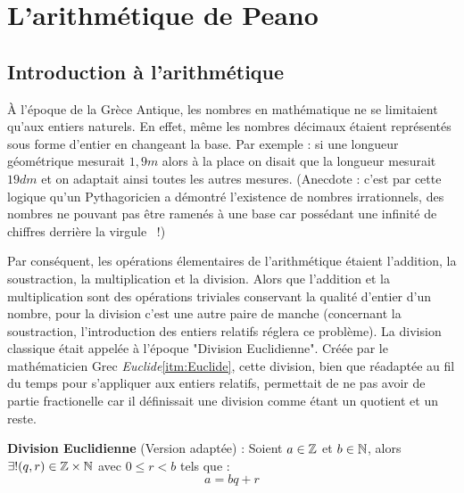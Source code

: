 \section{L'arithmétique de Peano}
\subsection{Introduction à l'arithmétique}

À l'époque de la Grèce Antique, les nombres en mathématique ne se limitaient qu'aux entiers naturels. \newline
En effet, même les nombres décimaux étaient représentés sous forme d'entier en changeant  la base. \newline
Par exemple : si une longueur géométrique mesurait $1,9 m$ alors à la place on disait que la longueur mesurait $19 dm$ et on adaptait ainsi toutes les autres mesures. \newline
\newline
(Anecdote : c'est par cette logique qu'un Pythagoricien a démontré l'existence de nombres irrationnels, des nombres ne pouvant pas être ramenés à une base car possédant une infinité de chiffres derrière la virgule \ !) \newline

Par conséquent, les opérations élementaires de l'arithmétique étaient l'addition, la soustraction, la multiplication et la division. \newline
Alors que l'addition et la multiplication sont des opérations triviales conservant la qualité d'entier d'un nombre, pour la division c'est une autre paire de manche (concernant la soustraction, l'introduction des entiers relatifs réglera ce problème). \newline
La division classique était appelée à l'époque "Division Euclidienne". \newline
Créée par le mathématicien Grec \textit{Euclide}\ref{itm:Euclide}, cette division, bien que réadaptée au fil du temps pour s'appliquer aux entiers relatifs,  permettait de ne pas avoir de partie fractionelle car il définissait une division comme étant un quotient et un reste.

\begin{theorem}
\textbf{Division Euclidienne} (Version adaptée) : \newline
Soient $a \in \mathbb{Z}$ et $b \in \mathbb{N}$, alors $\exists! (q,r) \in \mathbb{Z} \times \mathbb{N}$ avec $0 \leq r < b$ tels que : \newline
$$a = bq + r$$
\end{theorem}

